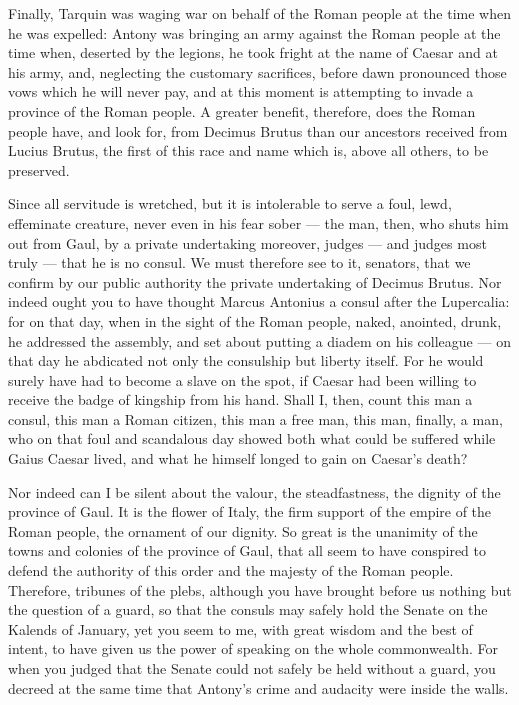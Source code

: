  Finally, Tarquin was waging war on behalf of the Roman people at the time when he was expelled: Antony was bringing an army against the Roman people at the time when, deserted by the legions, he took fright at the name of Caesar and at his army, and, neglecting the customary sacrifices, before dawn pronounced those vows which he will never pay, and at this moment is attempting to invade a province of the Roman people. A greater benefit, therefore, does the Roman people have, and look for, from Decimus Brutus than our ancestors received from Lucius Brutus, the first of this race and name which is, above all others, to be preserved.

 Since all servitude is wretched, but it is intolerable to serve a foul, lewd, effeminate creature, never even in his fear sober --- the man, then, who shuts him out from Gaul, by a private undertaking moreover, judges --- and judges most truly --- that he is no consul. We must therefore see to it, senators, that we confirm by our public authority the private undertaking of Decimus Brutus. Nor indeed ought you to have thought Marcus Antonius a consul after the Lupercalia: for on that day, when in the sight of the Roman people, naked, anointed, drunk, he addressed the assembly, and set about putting a diadem on his colleague --- on that day he abdicated not only the consulship but liberty itself. For he would surely have had to become a slave on the spot, if Caesar had been willing to receive the badge of kingship from his hand. Shall I, then, count this man a consul, this man a Roman citizen, this man a free man, this man, finally, a man, who on that foul and scandalous day showed both what could be suffered while Gaius Caesar lived, and what he himself longed to gain on Caesar's death?

 Nor indeed can I be silent about the valour, the steadfastness, the dignity of the province of Gaul. It is the flower of Italy, the firm support of the empire of the Roman people, the ornament of our dignity. So great is the unanimity of the towns and colonies of the province of Gaul, that all seem to have conspired to defend the authority of this order and the majesty of the Roman people. Therefore, tribunes of the plebs, although you have brought before us nothing but the question of a guard, so that the consuls may safely hold the Senate on the Kalends of January, yet you seem to me, with great wisdom and the best of intent, to have given us the power of speaking on the whole commonwealth. For when you judged that the Senate could not safely be held without a guard, you decreed at the same time that Antony's crime and audacity were inside the walls.

